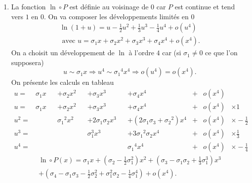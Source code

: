 \begin{enumerate}
\begin{enumerate}
  \item La fonction $\ln \circ P$ est définie au voisinage de $0$ car $P$ est continue et tend vers $1$ en $0$. On va composer les développements limités en $0$
\begin{multline*}
  \ln(1+u) = u -\frac{1}{2}u^2 + \frac{1}{3}u^3 - \frac{1}{4}u^4 + o(u^4)\\
  \text{ avec } u = \sigma_1 x + \sigma_2 x^2 + \sigma_3 x^3 + \sigma_4 x^4 + o(x^4). 
\end{multline*}
On a choisit un développement de $\ln$ à l'ordre $4$ car (si $\sigma_1 \neq 0$ ce que l'on supposera)
\[
  u \sim \sigma_1 x \Rightarrow u^4 \sim {\sigma_1}^4 x^4 \Rightarrow o(u^4) = o(x^4).
\]
On présente les calculs en tableau
\begin{align*}
  u   = &\sigma_1 x& &+\sigma_2 x^2&     &+\sigma_3 x^3&                     &+   \sigma_4 x^4&  + & o(x^4) & \\
  u   = &\sigma_1 x& &+ \sigma_2 x^2&    &+\sigma_3 x^3&                    &+   \sigma_4 x^4 & + & o(x^4) &\times 1\\
  u^2 = &           & & {\sigma_1}^2 x^2& &+2\sigma_1\sigma_2 x^3& &+  (2\sigma_1 \sigma_3 +{\sigma_2}^2) x^4& + & o(x^4) &\times -\frac{1}{2}\\
  u^3 = &           & &                 & &         \sigma_1^3 x^3&  &+3{\sigma_1}^2\sigma_2 x^4& + & o(x^4) &\times \frac{1}{3}\\
  u^4 = &           & &                 & &                     &  &          {\sigma_1}^4 x^4& +& o(x^4) &\times -\frac{1}{4}
\end{align*}
\begin{multline*}
  \ln \circ P(x) = \sigma_1 x +\left(\sigma_2 - \frac{1}{2}\sigma_1^2\right)x^2
  +\left(\sigma_3 -\sigma_1 \sigma_2 +\frac{1}{3}\sigma_1^3\right)x^3 \\
  +\left(\sigma_4 - \sigma_1 \sigma_3 -\frac{1}{2}\sigma_2^2 + \sigma_1^2 \sigma_2 - \frac{1}{4}\sigma_1^4 \right) + o(x^4).  
\end{multline*}


\end{enumerate}
\end{enumerate}

